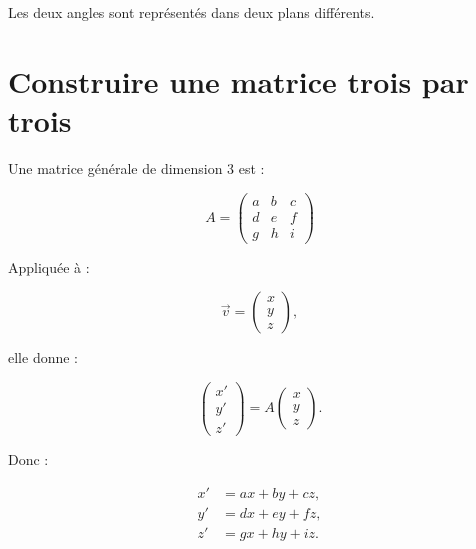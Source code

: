 \documentclass[11pt,a4paper]{article}
\newcommand{\sectiontitle}[1]{\section{#1}}
\begin{document}
\begin{center}

\end{center}

Les deux angles sont représentés dans deux plans différents.


\sectiontitle{Construire une matrice trois par trois}

Une matrice générale de dimension 3 est :

\[
\boxed{
A=
\begin{pmatrix}
 a&b&c\\
 d&e&f\\
 g&h&i
\end{pmatrix}}
\]

Appliquée à :

\[
\vec v=
\begin{pmatrix}
 x\\
 y\\
 z
\end{pmatrix},
\]

elle donne :

\[
\begin{pmatrix}
x'\\y'\\z'\end{pmatrix}
=
A
\begin{pmatrix}x\\y\\z\end{pmatrix}.
\]

Donc :

\[
\boxed{
\begin{aligned}
x'&=ax+by+cz,\\
y'&=dx+ey+fz,\\
z'&=gx+hy+iz.
\end{aligned}}
\]
\end{document}
